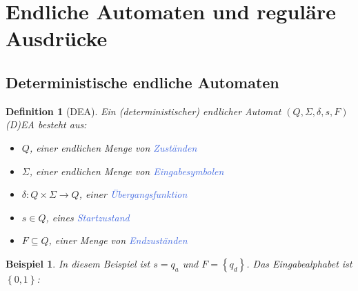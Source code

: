 \documentclass[11pt]{article}
\newcommand{\tcol}[1]{\textcolor{RoyalBlue}{#1}}
\newcommand{\set}[1]{\left\lbrace #1\right\rbrace}
\theoremstyle{break}
\newtheorem{defi}[satz]{Definition}
\newtheorem{beis}[satz]{Beispiel}
\begin{document}
    \section{Endliche Automaten und reguläre Ausdrücke}
	\label{sec:endliche-automatenindexund-reguläre-ausdrückeindex}


    \subsection{Deterministische endliche Automaten}
	\label{subsec:deterministische-endliche-automatenindex}

    \begin{defi}[DEA]
        Ein (deterministischer) endlicher Automat $(Q,\Sigma ,\delta ,s,F)$ (D)EA besteht aus:
        \begin{itemize}
            \item $Q$, einer endlichen Menge von \tcol{Zuständen}
            \item $\Sigma$, einer endlichen Menge von \tcol{Eingabesymbolen}
            \item $\delta\colon Q\times\Sigma\to Q$, einer \tcol{Übergangsfunktion}
            \item $s\in Q$, eines \tcol{Startzustand}
            \item $F\subseteq Q$, einer Menge von \tcol{Endzuständen}
        \end{itemize}
    \end{defi}

    \begin{beis}
        In diesem Beispiel ist $s=q_a$ und $F=\set{q_d}$.
        Das Eingabealphabet ist $\set{0,1}$:\\
        \begin{center}
        \end{center}
    \end{beis}
\end{document}
